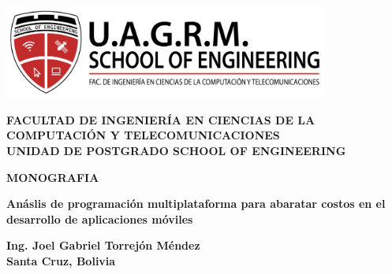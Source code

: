 \begin{titlepage}
    \begin{center}
        \includegraphics[width=0.8\textwidth]{images/logo_soe.png} \\
        \vspace{1cm}

        {\fontsize{18pt}{10pt}\selectfont\textbf{FACULTAD DE INGENIERÍA EN CIENCIAS DE LA COMPUTACIÓN Y TELECOMUNICACIONES}} \\
        \vspace{2cm}
        {\fontsize{18pt}{5pt}\selectfont\textbf{UNIDAD DE POSTGRADO SCHOOL OF ENGINEERING}} \\
        \vspace{0.5cm}
        
        \vspace{0.5cm}
        {\fontsize{20pt}{5pt}\selectfont\textbf{MONOGRAFIA}} \\
        \vspace{1cm}
        
        {\fontsize{16pt}{5pt}\selectfont\textbf{Anáslis de programación multiplataforma para abaratar costos en el desarrollo de aplicaciones móviles}} \\
        \vspace{1cm}
        
        \vspace{2cm}
        {\fontsize{14pt}{22pt}\selectfont\textbf{Ing. Joel Gabriel Torrejón Méndez}} \\
        
        \vfill
        \textbf{Santa Cruz, Bolivia} \\
    \end{center}
\end{titlepage}
    